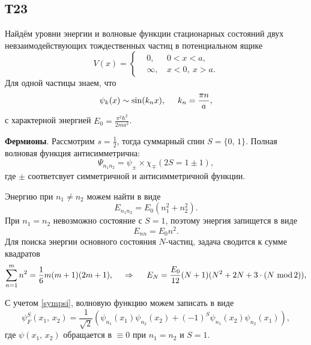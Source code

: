 \subsection*{Т23}

Найдём уровни энергии и волновые функции стационарных состояний двух невзаимодействующих тождественных частиц в потенциальном ящике
\begin{equation*}
	V(x) = \left\{\begin{aligned}
	    &0,\, &0 < x < a,\\
	    &\infty,\, &x<0,\ x > a.
	\end{aligned}\right.
\end{equation*}
Для одной частицы знаем, что
\begin{equation*}
	\psi_k (x) \sim \sin(k_n x), \hspace{5 mm} 
	k_n = \frac{\pi n}{a},
\end{equation*}
с характерной энергией $E_0 = \frac{\pi^2 \hbar^2}{2 m a^2}$.

\textbf{Фермионы}. Рассмотрим $s=\frac{1}{2}$, тогда суммарный спин $S = \{0,\, 1\}$. Полная волновая функция антисимметрична:
\begin{equation}
	\Psi_{n_1 n_2} = \psi_{\pm} \times  \chi_{\mp}(2S=1 \pm 1),
	\label{sympsi}
\end{equation}
где $\pm$ соответсвует симметричной и антисимметричной функции. 

Энергию при $n_1 \neq n_2$ можем найти в виде
\begin{equation*}
	E_{n_1 n_2} = E_0 \left(n_1^2 + n_2^2\right).
\end{equation*}
При $n_1 = n_2$ невозможно состояние с $S=1$, поэтому энергия запищется в виде
\begin{equation*}
	E_{nn} = E_0 n^2.
\end{equation*}
Для поиска энергии основного состояния $N$-частиц, задача сводится к сумме квадратов
\begin{equation*}
	\sum_{n=1}^{m} n^2 = \frac{1}{6} m (m+1) (2 m+1),
	\hspace{0.5cm} \Rightarrow \hspace{0.5cm}
	E_N = \frac{E_0}{12} (N+1)(N^2 + 2 N + 3 \cdot  (N\ \text{mod}\, 2) ),
\end{equation*}

С учетом \eqref{sympsi}, волновую функцию можем записать в виде
\begin{equation*}
	\psi_F^S(x_1,\, x_2) = \frac{1}{\sqrt{2}}\left(
		\psi_{n_1}(x_1) \psi_{n_2} (x_2) + (-1)^{S} \psi_{n_1} (x_2) \psi_{n_2} (x_1)
	\right),
\end{equation*}
где $\psi(x_1,\, x_2)$ обращается в $\equiv 0$ при $n_1 = n_2$ и $S=1$.

